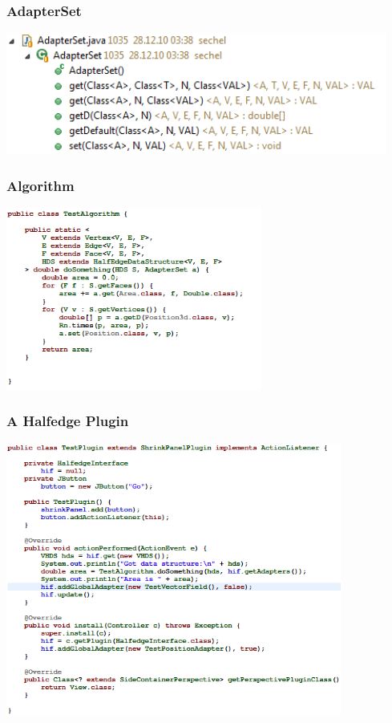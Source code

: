 \documentclass[12pt]{beamer}
\begin{document}
\begin{frame}
\frametitle{AdapterSet}
\begin{center}
\includegraphics[height=4cm]{adapterset.png}\\	
\end{center}
\end{frame}

\begin{frame}
\frametitle{Algorithm}
\begin{center}
\includegraphics[height=6cm]{algorithm.png}\\	
\end{center}
\end{frame}

\begin{frame}
\frametitle{A Halfedge Plugin}
\begin{center}
\includegraphics[height=9cm]{testplugin.png}\\	
\end{center}
\end{frame}
\end{document}
